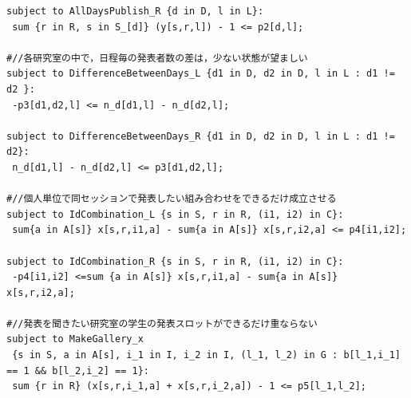 \documentclass[a4paper,12pt,fleqn]{jarticle}
\begin{document}
\begin{verbatim}
subject to AllDaysPublish_R {d in D, l in L}:
 sum {r in R, s in S_[d]} (y[s,r,l]) - 1 <= p2[d,l];

#//各研究室の中で，日程毎の発表者数の差は，少ない状態が望ましい
subject to DifferenceBetweenDays_L {d1 in D, d2 in D, l in L : d1 != d2 }:
 -p3[d1,d2,l] <= n_d[d1,l] - n_d[d2,l];

subject to DifferenceBetweenDays_R {d1 in D, d2 in D, l in L : d1 != d2}:
 n_d[d1,l] - n_d[d2,l] <= p3[d1,d2,l];

#//個人単位で同セッションで発表したい組み合わせをできるだけ成立させる
subject to IdCombination_L {s in S, r in R, (i1, i2) in C}:
 sum{a in A[s]} x[s,r,i1,a] - sum{a in A[s]} x[s,r,i2,a] <= p4[i1,i2];

subject to IdCombination_R {s in S, r in R, (i1, i2) in C}:
 -p4[i1,i2] <=sum {a in A[s]} x[s,r,i1,a] - sum{a in A[s]} x[s,r,i2,a];

#//発表を聞きたい研究室の学生の発表スロットができるだけ重ならない
subject to MakeGallery_x
 {s in S, a in A[s], i_1 in I, i_2 in I, (l_1, l_2) in G : b[l_1,i_1] == 1 && b[l_2,i_2] == 1}:
 sum {r in R} (x[s,r,i_1,a] + x[s,r,i_2,a]) - 1 <= p5[l_1,l_2];
\end{verbatim}
\end{document}
